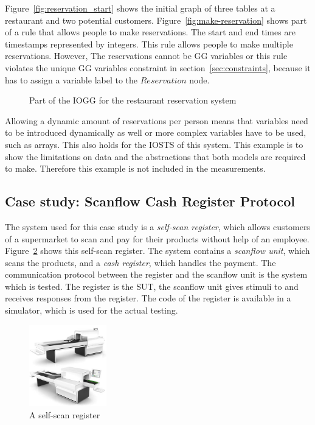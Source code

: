 Figure~\ref{fig:reservation_start} shows the initial graph of three tables at a restaurant and two potential customers. Figure~\ref{fig:make-reservation} shows part of a rule that allows people to make reservations. The start and end times are timestamps represented by integers. This rule allows people to make multiple reservations. However, The reservations cannot be GG variables or this rule violates the unique GG variables constraint in section~\ref{sec:constraints}, because it has to assign a variable label to the $Reservation$ node.

\begin{figure}[ht]
  \begin{center}
    \hspace{20px}
  \end{center}
  \caption{Part of the IOGG for the restaurant reservation system}
  \label{fig:gg-reservation}
\end{figure}

Allowing a dynamic amount of reservations per person means that variables need to be introduced dynamically as well or more complex variables have to be used, such as arrays. This also holds for the IOSTS of this system. This example is to show the limitations on data and the abstractions that both models are required to make. Therefore this example is not included in the measurements. 

\subsection{Case study: Scanflow Cash Register Protocol}
The system used for this case study is a \textit{self-scan register}, which allows customers of a supermarket to scan and pay for their products without help of an employee. Figure~\ref{fig:register} shows this self-scan register. The system contains a \textit{scanflow unit}, which scans the products, and a \textit{cash register}, which handles the payment. The communication protocol between the register and the scanflow unit is the system which is tested. The register is the SUT, the scanflow unit gives stimuli to and receives responses from the register. The code of the register is available in a simulator, which is used for the actual testing.

\begin{figure}[ht]
  \begin{center}
    \includegraphics[width=0.3\textwidth]{scanflow.jpg}
  \end{center}
  \caption{A self-scan register}
  \label{fig:register}
\end{figure}


